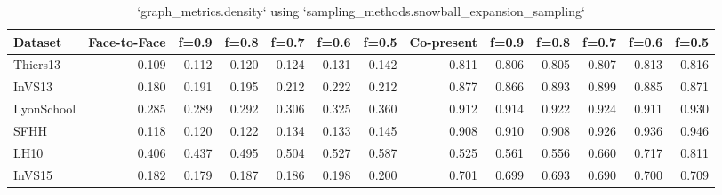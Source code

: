\begin{table}[ht]
\begin{tabular}{lrrrrrrrrrrrr}
\hline
 Dataset    &   Face-to-Face &   f=0.9 &   f=0.8 &   f=0.7 &   f=0.6 &   f=0.5 &   Co-present &   f=0.9 &   f=0.8 &   f=0.7 &   f=0.6 &   f=0.5 \\
\hline
 Thiers13   &          0.109 &   0.112 &   0.120 &   0.124 &   0.131 &   0.142 &        0.811 &   0.806 &   0.805 &   0.807 &   0.813 &   0.816 \\
 InVS13     &          0.180 &   0.191 &   0.195 &   0.212 &   0.222 &   0.212 &        0.877 &   0.866 &   0.893 &   0.899 &   0.885 &   0.871 \\
 LyonSchool &          0.285 &   0.289 &   0.292 &   0.306 &   0.325 &   0.360 &        0.912 &   0.914 &   0.922 &   0.924 &   0.911 &   0.930 \\
 SFHH       &          0.118 &   0.120 &   0.122 &   0.134 &   0.133 &   0.145 &        0.908 &   0.910 &   0.908 &   0.926 &   0.936 &   0.946 \\
 LH10       &          0.406 &   0.437 &   0.495 &   0.504 &   0.527 &   0.587 &        0.525 &   0.561 &   0.556 &   0.660 &   0.717 &   0.811 \\
 InVS15     &          0.182 &   0.179 &   0.187 &   0.186 &   0.198 &   0.200 &        0.701 &   0.699 &   0.693 &   0.690 &   0.700 &   0.709 \\
\hline
\end{tabular}
\caption{`graph_metrics.density` using `sampling_methods.snowball_expansion_sampling`}
\end{table}